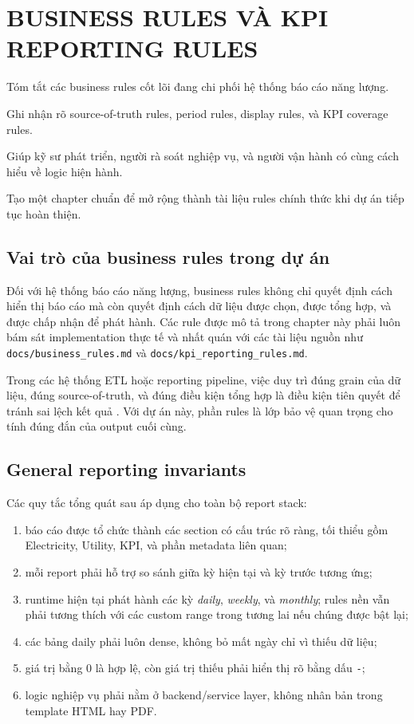 \chapter{BUSINESS RULES VÀ KPI REPORTING RULES}

\begin{ChapterObjectives}
\item Tóm tắt các business rules cốt lõi đang chi phối hệ thống báo cáo năng lượng.
\item Ghi nhận rõ source-of-truth rules, period rules, display rules, và KPI coverage rules.
\item Giúp kỹ sư phát triển, người rà soát nghiệp vụ, và người vận hành có cùng cách hiểu về logic hiện hành.
\item Tạo một chapter chuẩn để mở rộng thành tài liệu rules chính thức khi dự án tiếp tục hoàn thiện.
\end{ChapterObjectives}

\section{Vai trò của business rules trong dự án}

Đối với hệ thống báo cáo năng lượng, business rules không chỉ quyết định cách hiển thị báo cáo mà còn quyết định cách dữ liệu được chọn, được tổng hợp, và được chấp nhận để phát hành. Các rule được mô tả trong chapter này phải luôn bám sát implementation thực tế và nhất quán với các tài liệu nguồn như \texttt{docs/business\_rules.md} và \texttt{docs/kpi\_reporting\_rules.md}.

Trong các hệ thống ETL hoặc reporting pipeline, việc duy trì đúng grain của dữ liệu, đúng source-of-truth, và đúng điều kiện tổng hợp là điều kiện tiên quyết để tránh sai lệch kết quả \cite{ref_kimball}. Với dự án này, phần rules là lớp bảo vệ quan trọng cho tính đúng đắn của output cuối cùng.

\section{General reporting invariants}

Các quy tắc tổng quát sau áp dụng cho toàn bộ report stack:

\begin{enumerate}[label=-]
\item báo cáo được tổ chức thành các section có cấu trúc rõ ràng, tối thiểu gồm Electricity, Utility, KPI, và phần metadata liên quan;
\item mỗi report phải hỗ trợ so sánh giữa kỳ hiện tại và kỳ trước tương ứng;
\item runtime hiện tại phát hành các kỳ \textit{daily}, \textit{weekly}, và \textit{monthly}; rules nền vẫn phải tương thích với các custom range trong tương lai nếu chúng được bật lại;
\item các bảng daily phải luôn dense, không bỏ mất ngày chỉ vì thiếu dữ liệu;
\item giá trị bằng 0 là hợp lệ, còn giá trị thiếu phải hiển thị rõ bằng dấu \texttt{-};
\item logic nghiệp vụ phải nằm ở backend/service layer, không nhân bản trong template HTML hay PDF.
\end{enumerate}

